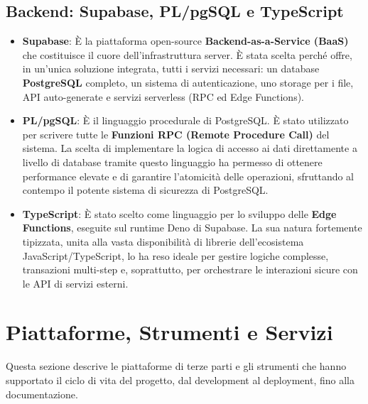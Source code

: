\subsection{Backend: Supabase, PL/pgSQL e TypeScript}\label{subsec:backend:-supabase-pl/pgsql-e-typescript}
\begin{itemize}
	\item \textbf{Supabase}: È la piattaforma open-source \textbf{Backend-as-a-Service (BaaS)} che costituisce il cuore dell'infrastruttura server.
	È stata scelta perché offre, in un'unica soluzione integrata, tutti i servizi necessari: un database \textbf{PostgreSQL} completo, un sistema di autenticazione, uno storage per i file, API auto-generate e servizi serverless (RPC ed Edge Functions).
	\item \textbf{PL/pgSQL}: È il linguaggio procedurale di PostgreSQL. È stato utilizzato per scrivere tutte le \textbf{Funzioni RPC (Remote Procedure Call)} del sistema.
	La scelta di implementare la logica di accesso ai dati direttamente a livello di database tramite questo linguaggio ha permesso di ottenere performance elevate e di garantire l'atomicità delle operazioni, sfruttando al contempo il potente sistema di sicurezza di PostgreSQL\@.
	\item \textbf{TypeScript}: È stato scelto come linguaggio per lo sviluppo delle \textbf{Edge Functions}, eseguite sul runtime Deno di Supabase.
	La sua natura fortemente tipizzata, unita alla vasta disponibilità di librerie dell'ecosistema JavaScript/TypeScript, lo ha reso ideale per gestire logiche complesse, transazioni multi-step e, soprattutto, per orchestrare le interazioni sicure con le API di servizi esterni.
\end{itemize}

\section{Piattaforme, Strumenti e Servizi}\label{sec:piattaforme-strumenti-e-servizi}
Questa sezione descrive le piattaforme di terze parti e gli strumenti che hanno supportato il ciclo di vita del progetto, dal development al deployment, fino alla documentazione.

